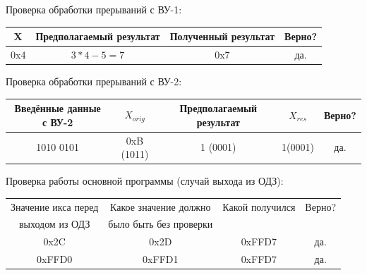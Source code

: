 Проверка обработки прерываний с ВУ-1:
\begin{center}
    \begin{tabular}{|c|c|c|c|}
        \hline
        X   & Предполагаемый результат & Полученный результат & Верно? \\
        \hline
        0x4 & $3*4-5=7$                & 0x7                  & да.    \\
        \hline
    \end{tabular}
\end{center}
Проверка обработки прерываний с ВУ-2:
\begin{center}
    \begin{tabular}{|c|c|c|c|c|}
        \hline
        Введённые данные с ВУ-2 & $X_{orig}$ & Предполагаемый результат & $X_{res}$ & Верно? \\
        \hline
        1010 0101               & 0xB (1011) & 1 (0001)                 & 1(0001)   & да.    \\
        \hline
    \end{tabular}
\end{center}
Проверка работы основной программы (случай выхода из ОДЗ):
\begin{center}
    \begin{tabular}{|c|c|c|c|}
        \hline
        Значение икса перед & Какое значение должно  & Какой получился & Верно? \\
        выходом из ОДЗ      & было быть без проверки &                 &        \\
        \hline
        0x2C                & 0x2D                   & 0xFFD7          & да.    \\
        0xFFD0              & 0xFFD1                 & 0xFFD7          & да.    \\
        \hline
    \end{tabular}
\end{center}
